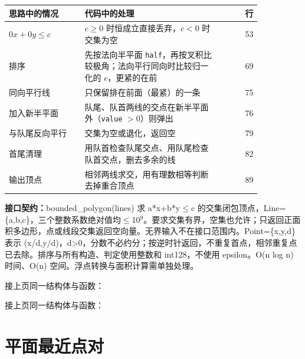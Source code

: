 \begin{center}\small
\begin{tabular}{@{}p{0.30\linewidth}p{0.55\linewidth}r@{}}
\toprule
思路中的情况 & 代码中的处理 & 行\\
\midrule
$0x+0y\le c$ & $c\ge0$ 时恒成立直接丢弃，$c<0$ 时交集为空 & 53\\
排序 & 先按法向半平面 \texttt{half}，再按叉积比较极角；法向平行同向时比较归一化的 $c$，更紧的在前 & 69\\
同向平行线 & 只保留排在前面（最紧）的一条 & 75\\
加入新半平面 & 队尾、队首两线的交点在新半平面外（\texttt{value} $>0$）则弹出 & 76\\
与队尾反向平行 & 交集为空或退化，返回空 & 79\\
首尾清理 & 用队首检查队尾交点、用队尾检查队首交点，删去多余的线 & 82\\
输出顶点 & 相邻两线求交，用有理数相等判断去掉重合顶点 & 89\\
\bottomrule
\end{tabular}
\end{center}



{\sloppy{}\noindent\textbf{接口契约：}bounded\_polygon(lines) 求 a*x+b*y$\le$c 的交集闭包顶点，Line=\{a,b,c\}，三个整数系数绝对值均$\le$10$^{9}$。要求交集有界，空集也允许；只返回正面积多边形，点或线段交集返回空向量。无界输入不在接口范围内。Point=\{x,y,d\} 表示 (x/d,y/d)，d>0，分数不必约分；按逆时针返回，不重复首点，相邻重复点已去除。排序与所有构造、判定使用整数和 int128，不使用 epsilon。O(n log n) 时间、O(n) 空间。浮点转换与面积计算需单独处理。\par}

\Needspace{479pt}



\newpage

\noindent 接上页同一结构体与函数：



\newpage

\noindent 接上页同一结构体与函数：



\Needspace{643pt}

\chapter{平面最近点对}


